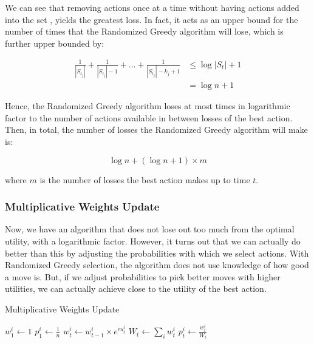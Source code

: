 \documentclass[12pt]{article}
\begin{document}
We can see that removing actions once at a time without having actions added into the set , yields the greatest loss. In fact, it acts as an upper bound for the number of times that the Randomized Greedy algorithm will lose, which is further upper bounded by:

\begin{equation*}
\begin{aligned}
\frac{1}{|S_{t_j}|} + \frac{1}{|S_{t_j}| - 1} + ... + \frac{1}{|S_{t_j}| - k_j + 1} & \leq \log|S_t| + 1\\
&= \log n + 1
\end{aligned}
\end{equation*}

Hence, the Randomized Greedy algorithm loses at most times in logarithmic factor to the number of actions available in between losses of the best action. Then, in total, the number of losses the Randomized Greedy algorithm will make is:

\begin{equation*}
\log n + (\log n + 1 )\times m
\end{equation*}

where $m$ is the number of losses the best action makes up to time $t$.

\subsubsection{Multiplicative Weights Update}

Now, we have an algorithm that does not lose out too much from the optimal utility,  with a logarithmic factor. However, it turns out that we can actually do better than this by adjusting the probabilities with which we select actions. With Randomized Greedy selection, the algorithm does not use knowledge of how good a move is. But, if we adjust probabilities to pick better moves with higher utilities, we can actually achieve close to the utility of the best action.

\begin{algorithm}
\caption{Multiplicative Weights Update}\label{euclid}
\begin{algorithmic}[1]
\State $w^i_1 \leftarrow 1$
\State $p^i_1 \leftarrow \frac{1}{n}$
\EndFor
{}
		\State $w^i_t \leftarrow w^i_{t-1} \times e^{\epsilon u^i_t}$
	\EndFor
	\State $W_t \leftarrow \sum_i w^i_t$
		\State $p^i_t \leftarrow \frac{w^i_t}{W_t}$
	\EndFor
\EndFor
\end{algorithmic}
\end{algorithm}
\end{document}
